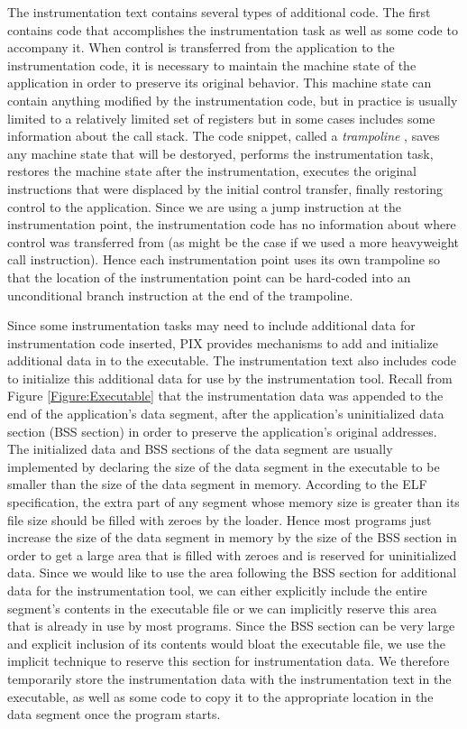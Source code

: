 The instrumentation text contains several types of additional code. The first
contains code that accomplishes the instrumentation task as well as some code to
accompany it. When control is transferred from the application to the
instrumentation code, it is necessary to maintain the machine state of
the application in order to preserve its original behavior. This machine state
can contain anything modified by the instrumentation code, but in practice is
usually limited to a relatively limited set of registers but in some cases includes
some information about the call stack. The code snippet, called a \textit{trampoline} \cite{buck2000api}, 
saves any machine state that will be destoryed, performs the instrumentation task, restores
the machine state after the instrumentation, executes the
original instructions that were displaced by the initial control transfer,
finally restoring control to the application. Since we are using a jump instruction at the instrumentation point, the
instrumentation code has no information about where control was transferred from
(as might be the case if we used a more heavyweight call instruction). Hence
each instrumentation point uses its own trampoline so that the location of the
instrumentation point can be hard-coded into an unconditional branch instruction
at the end of the trampoline.

Since some instrumentation tasks may need to include additional data for instrumentation code inserted,
PIX provides mechanisms to add and initialize additional data in to the executable.
The instrumentation text also includes code to initialize this additional data for use by the
instrumentation tool. Recall from Figure \ref{Figure:Executable} that the instrumentation
data was appended to the end of the application's data segment, after the
application's uninitialized data section (BSS section) in order to preserve the application's 
original addresses. The initialized data and BSS
sections of the data segment are usually implemented by declaring the size of
the data segment in the executable to be smaller than the size of the data
segment in memory. According to the ELF specification\cite{standard1995executable}, the extra part of any
segment whose memory size is greater than its file size should be filled with
zeroes by the loader. Hence most programs just increase the size of the data
segment in memory by the size of the BSS section in order to get a large
area that is filled with zeroes and is reserved for uninitialized data. Since we
would like to use the area following the BSS section for additional
data for the instrumentation tool, we can either explicitly include the entire
segment's contents in the executable file or we can implicitly reserve this area
that is already in use by most programs.
Since the BSS section can be very large and explicit inclusion of its contents
would bloat the  executable file, we use the implicit
technique to reserve this section for instrumentation data. We therefore
temporarily store the instrumentation data with the instrumentation text in the
executable, as well as some code to copy it to the appropriate location in the
data segment once the program starts.
